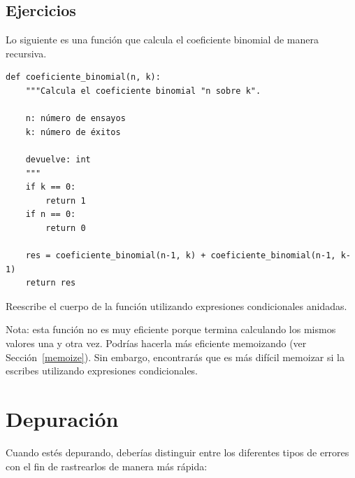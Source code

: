 \documentclass[10pt]{book}
\begin{document}
\section{Ejercicios}

\begin{exercise}

Lo siguiente es una función que calcula el
coeficiente binomial de manera recursiva.

\begin{verbatim}
def coeficiente_binomial(n, k):
    """Calcula el coeficiente binomial "n sobre k".

    n: número de ensayos
    k: número de éxitos

    devuelve: int
    """
    if k == 0:
        return 1
    if n == 0:
        return 0

    res = coeficiente_binomial(n-1, k) + coeficiente_binomial(n-1, k-1)
    return res
\end{verbatim}

Reescribe el cuerpo de la función utilizando expresiones condicionales
anidadas.

Nota: esta función no es muy eficiente porque termina calculando
los mismos valores una y otra vez.  Podrías hacerla más eficiente
memoizando (ver Sección~\ref{memoize}).  Sin embargo, encontrarás que es más difícil
memoizar si la escribes utilizando expresiones condicionales.

\end{exercise}



\appendix

\chapter{Depuración}

Cuando estés depurando, deberías distinguir entre los diferentes
tipos de errores con el fin de rastrearlos de manera más rápida:
\end{document}
